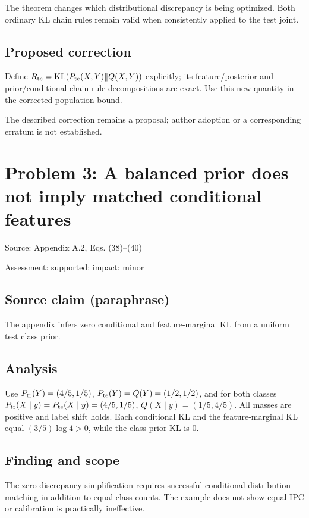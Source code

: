 \documentclass[11pt]{article}
\begin{document}
The theorem changes which distributional discrepancy is being optimized. Both ordinary KL chain rules remain valid when consistently applied to the test joint.

\subsection*{Proposed correction}

Define \(R_{\rm te}=\mathrm{KL}(P_{\rm te}(X,Y)\|Q(X,Y))\) explicitly; its feature/posterior and prior/conditional chain-rule decompositions are exact. Use this new quantity in the corrected population bound.

The described correction remains a proposal; author adoption or a corresponding erratum is not established.

\section*{Problem 3: A balanced prior does not imply matched conditional features}

Source: Appendix A.2, Eqs. (38)–(40)

Assessment: supported; impact: minor

\subsection*{Source claim (paraphrase)}

The appendix infers zero conditional and feature-marginal KL from a uniform test class prior.

\subsection*{Analysis}

Use \(P_{\rm tr}(Y)=(4/5,1/5)\), \(P_{\rm te}(Y)=Q(Y)=(1/2,1/2)\), and for both classes \(P_{\rm tr}(X\mid y)=P_{\rm te}(X\mid y)=(4/5,1/5)\), \(Q(X\mid y)=(1/5,4/5)\). All masses are positive and label shift holds. Each conditional KL and the feature-marginal KL equal \((3/5)\log4>0\), while the class-prior KL is \(0\).

\subsection*{Finding and scope}

The zero-discrepancy simplification requires successful conditional distribution matching in addition to equal class counts. The example does not show equal IPC or calibration is practically ineffective.
\end{document}
